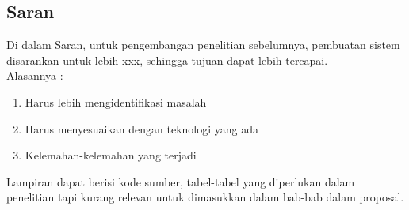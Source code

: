 \documentclass{final_project}
\begin{document}
\subsection{Saran}

Di dalam Saran, untuk pengembangan penelitian sebelumnya, pembuatan sistem disarankan untuk lebih xxx, sehingga tujuan dapat lebih tercapai.\\
Alasannya :
\begin{enumerate}
    \item Harus lebih mengidentifikasi masalah
    \item Harus menyesuaikan dengan teknologi yang ada
    \item Kelemahan-kelemahan yang terjadi 
\end{enumerate}

\daftarpustaka


Lampiran dapat berisi kode sumber, tabel-tabel yang diperlukan dalam penelitian tapi kurang relevan untuk dimasukkan dalam bab-bab dalam proposal. 
\end{document}
